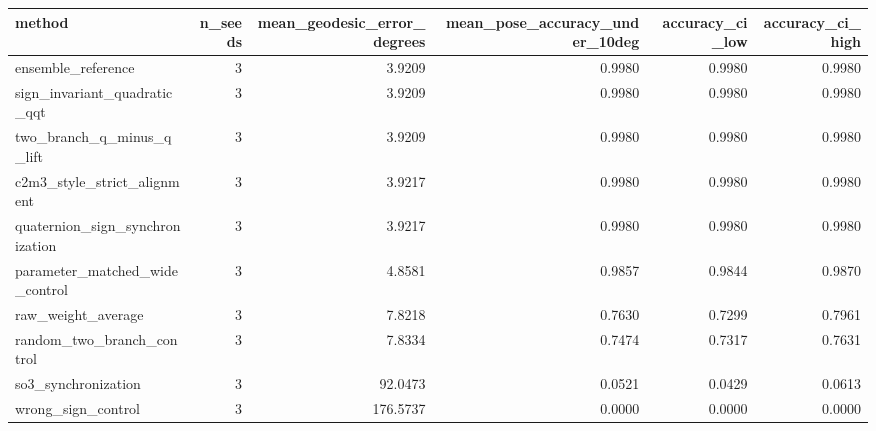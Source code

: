 \begin{tabular}{lrrrrr}
\toprule
method & n_seeds & mean_geodesic_error_degrees & mean_pose_accuracy_under_10deg & accuracy_ci_low & accuracy_ci_high \\
\midrule
ensemble_reference & 3 & 3.9209 & 0.9980 & 0.9980 & 0.9980 \\
sign_invariant_quadratic_qqt & 3 & 3.9209 & 0.9980 & 0.9980 & 0.9980 \\
two_branch_q_minus_q_lift & 3 & 3.9209 & 0.9980 & 0.9980 & 0.9980 \\
c2m3_style_strict_alignment & 3 & 3.9217 & 0.9980 & 0.9980 & 0.9980 \\
quaternion_sign_synchronization & 3 & 3.9217 & 0.9980 & 0.9980 & 0.9980 \\
parameter_matched_wide_control & 3 & 4.8581 & 0.9857 & 0.9844 & 0.9870 \\
raw_weight_average & 3 & 7.8218 & 0.7630 & 0.7299 & 0.7961 \\
random_two_branch_control & 3 & 7.8334 & 0.7474 & 0.7317 & 0.7631 \\
so3_synchronization & 3 & 92.0473 & 0.0521 & 0.0429 & 0.0613 \\
wrong_sign_control & 3 & 176.5737 & 0.0000 & 0.0000 & 0.0000 \\
\bottomrule
\end{tabular}
